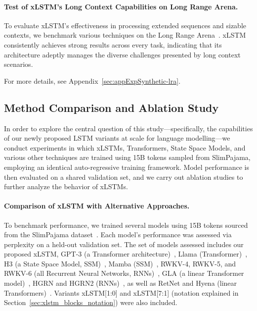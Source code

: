 \paragraph{Test of xLSTM's Long Context Capabilities on Long Range Arena.} To evaluate xLSTM's effectiveness in processing extended sequences and sizable contexts, we benchmark various techniques on the Long Range Arena~\citep{Tay:21}. xLSTM consistently achieves strong results across every task, indicating that its architecture adeptly manages the diverse challenges presented by long context scenarios.

For more details, see Appendix~\ref{sec:appExpSynthetic-lra}.

\subsection{Method Comparison and Ablation Study}
\label{sec:ExpComparison}

In order to explore the central question of this study—specifically, the capabilities of our newly proposed LSTM variants at scale for language modelling—we conduct experiments in which xLSTMs, Transformers, State Space Models, and various other techniques are trained using 15B tokens sampled from SlimPajama, employing an identical auto-regressive training framework. Model performance is then evaluated on a shared validation set, and we carry out ablation studies to further analyze the behavior of xLSTMs.

\paragraph{Comparison of xLSTM with Alternative Approaches.} To benchmark performance, we trained several models using 15B tokens sourced from the SlimPajama dataset~\citep{Soboleva:23}. Each model's performance was assessed via perplexity on a held-out validation set. The set of models assessed includes our proposed xLSTM, GPT-3 (a Transformer architecture)~\citep{Brown:20short}, Llama (Transformer)~\citep{Touvron:23arxiv}, H3 (a State Space Model, SSM)~\citep{Fu:23}, Mamba (SSM)~\citep{Gu:24arxiv}, RWKV-4, RWKV-5, and RWKV-6 (all Recurrent Neural Networks, RNNs)~\citep{Peng:23arxivshort, Peng:24arxivshort}, GLA (a linear Transformer model)~\citep{Yang:23arxiv}, HGRN and HGRN2 (RNNs)~\citep{Qin:23, Qin:24arxiv}, as well as RetNet and Hyena (linear Transformers)~\citep{Sun:23arxiv, Poli:23}. Variants xLSTM[1:0] and xLSTM[7:1] (notation explained in Section~\ref{sec:xlstm_blocks_notation}) were also included. 

